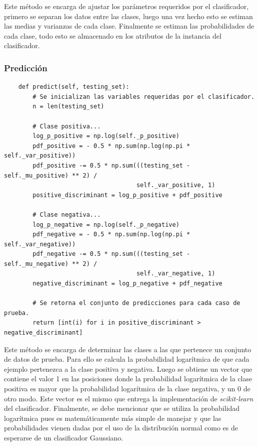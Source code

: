 \documentclass[letter, titlepage, 10pt]{article}
\begin{document}
Este método se encarga de ajustar los parámetros requeridos por el clasificador, primero se separan los datos entre las clases, luego una vez hecho esto se estiman las medias y varianzas de cada clase. Finalmente se estiman las probabilidades de cada clase, todo esto se almacenado en los atributos de la instancia del clasificador.

\subsubsection{Predicción}
\begin{lstlisting}
    def predict(self, testing_set):
        # Se inicializan las variables requeridas por el clasificador.
        n = len(testing_set)

        # Clase positiva...
        log_p_positive = np.log(self._p_positive)
        pdf_positive = - 0.5 * np.sum(np.log(np.pi * self._var_positive))
        pdf_positive -= 0.5 * np.sum(((testing_set - self._mu_positive) ** 2) /
                                     self._var_positive, 1)
        positive_discriminant = log_p_positive + pdf_positive

        # Clase negativa...
        log_p_negative = np.log(self._p_negative)
        pdf_negative = - 0.5 * np.sum(np.log(np.pi * self._var_negative))
        pdf_negative -= 0.5 * np.sum(((testing_set - self._mu_negative) ** 2) /
                                     self._var_negative, 1)
        negative_discriminant = log_p_negative + pdf_negative

        # Se retorna el conjunto de predicciones para cada caso de prueba.
        return [int(i) for i in positive_discriminant > negative_discriminant]
\end{lstlisting}

Este método se encarga de determinar las clases a las que pertenece un conjunto de datos de prueba. Para ello se calcula la probabilidad logarítmica de que cada ejemplo pertenezca a la clase positiva y negativa. Luego se obtiene un vector que contiene el valor 1 en las posiciones donde la probabilidad logarítmica de la clase positiva es mayor que la probabilidad logarítmica de la clase negativa, y un 0 de otro modo. Este vector es el mismo que entrega la implementación de \textit{scikit-learn} del clasificador. Finalmente, se debe mencionar que se utiliza la probabilidad logarítmica pues es matemáticamente más simple de manejar y que las probabilidades vienen dadas por el uso de la distribución normal como es de esperarse de un clasificador Gaussiano.
\end{document}
